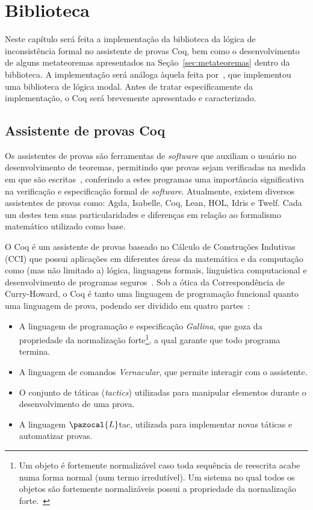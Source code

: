 \chapter{Biblioteca}\label{cap:biblioteca}
Neste capítulo será feita a implementação da biblioteca da lógica de inconsistência formal \lfium{} no assistente de provas Coq, bem como o desenvolvimento de alguns metateoremas apresentados na Seção~\ref{sec:metateoremas} dentro da biblioteca. A implementação será análoga àquela feita por~, que implementou uma biblioteca de lógica modal. Antes de tratar especificamente da implementação, o Coq será brevemente apresentado e caracterizado.

\section{Assistente de provas Coq}\label{sec:coq}
    Os assistentes de provas são ferramentas de \textit{software} que auxiliam o usuário no desenvolvimento de teoremas, permitindo que provas sejam verificadas na medida em que são escritas~\cite{geuvers2009proof}, conferindo a estes programas uma importância significativa na verificação e especificação formal de \textit{software}. Atualmente, existem diversos assistentes de provas como: Agda, Isabelle, Coq, Lean, HOL, Idris e Twelf. Cada um destes tem suas particularidades e diferenças em relação ao formalismo matemático utilizado como base.

    O Coq é um assistente de provas baseado no Cálculo de Construções Indutivas (CCI) que possui aplicações em diferentes áreas da matemática e da computação como (mas não limitado a) lógica, linguagens formais, linguística computacional e desenvolvimento de programas seguros~\cite{coqart}. Sob a ótica da Correspondência de Curry{-}Howard, o Coq é tanto uma linguagem de programação funcional quanto uma linguagem de prova, podendo ser dividido em quatro partes~\cite{silva2019certificaccao}:
    
    \begin{itemize}
        \item A linguagem de programação e especificação \textit{Gallina}, que goza da propriedade da normalização forte\footnote{Um objeto é fortemente normalizável caso toda sequência de reescrita acabe numa forma normal (num termo irredutível). Um sistema no qual todos os objetos são fortemente normalizáveis possui a propriedade da normalização forte.~\cite{nipkow2006rewriting}}, a qual garante que todo programa termina.
        \item A linguagem de comandos \textit{Vernacular}, que permite interagir com o assistente.
        \item O conjunto de táticas (\textit{tactics}) utilizadas para manipular elementos durante o desenvolvimento de uma prova.
        \item A linguagem $\pazocal{L}$tac, utilizada para implementar novas táticas e automatizar provas.
    \end{itemize}

